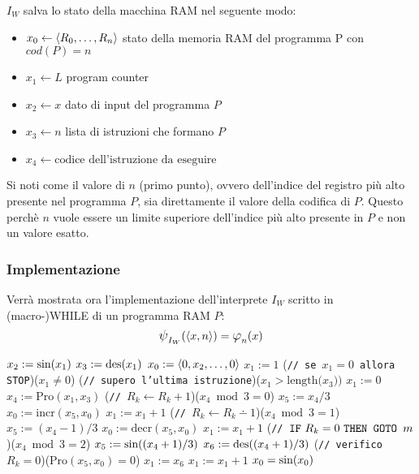 $I_W$ salva lo stato della macchina RAM nel seguente modo:
\begin{itemize}
    \item $x_0 \leftarrow \langle R_0,\dots,R_{n}\rangle$\hfill
        stato della memoria RAM del programma P con $cod(P)=n$
    \item $x_1 \leftarrow L$ \hfill program counter
    \item $x_2 \leftarrow x$ \hfill dato di input del programma $P$
    \item $x_3 \leftarrow n$ \hfill lista di istruzioni che formano $P$
    \item $x_4 \leftarrow \text{codice dell'istruzione da eseguire}$
\end{itemize}

Si noti come il valore di $n$ (primo punto), ovvero dell'indice del registro più alto 
presente nel programma $P$, sia direttamente il valore della codifica di $P$. Questo
perchè $n$ vuole essere un limite superiore dell'indice più alto presente in $P$ e non
un valore esatto.

\subsubsection*{Implementazione}
Verrà mostrata ora l'implementazione dell'interprete $I_W$ scritto in (macro-)WHILE di un
programma RAM $P$:
$$ \semanticaWHILE_{I_W}(\cantor{x,n})=\semanticaRAM_n(x) $$
\begin{tcolorbox}[colback=white,sharp corners,boxrule=.3mm]
\begin{algorithm}[H]
    $x_2 := \text{sin}(x_1)$\;
    $x_3 := \text{des}(x_1)$\;
    $x_0 := \langle0,x_2,\dots,0\rangle$\;
    $x_1 := 1$\;
    \While(\hfill\texttt{// se $x_1=0$ allora STOP}){($x_1\neq 0$)}{
        \eIf(\hfill\texttt{// supero l'ultima istruzione}){($x_1>\text{length($x_3$))}$}{
            $x_1:=0$
        }{
            $x_4 := \text{Pro}(x_1,x_3)$
            \If(\hfill\texttt{// }$R_k\leftarrow R_k+1$){($x_4\bmod{3}=0$)}{
                $x_5 := x_4 / 3$
                $x_0 := \text{incr}(x_5,x_0)$\;
                $x_1 := x_1+1$\;
            }
            \If(\hfill\texttt{// }$R_k\leftarrow R_k\dotminus1$){($x_4\bmod{3}=1$)}{
                $x_5 := (x_4-1) / 3$
                $x_0 := \text{decr}(x_5,x_0)$\;
                $x_1 := x_1+1$\;
            }
            \If(\hfill\texttt{// }$\texttt{IF}\text{ $R_k=0$ }\texttt{THEN GOTO }\text{$m$}$){($x_4\bmod{3}=2$)}{
                $x_5 := \text{sin}((x_4+1)/3)$
                $x_6 := \text{des}((x_4+1)/3)$
                \eIf(\hfill\texttt{// verifico }$R_k=0$){(Pro$(x_5,x_0)=0$)}{
                    $x_1:=x_6$\;
                }{
                    $x_1:=x_1+1$\;
                }
            }
        }
    }
    $x_0 = \text{sin}(x_0)$
\end{algorithm}
\end{tcolorbox}

